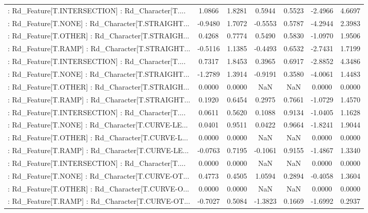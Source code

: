 \begin{longtable}{p{4cm}cccccc}
 : Rd\_Feature[T.INTERSECTION] : Rd\_Character[T.... &  1.0866 &    1.8281 &  0.5944 &       0.5523 & -2.4966 &  4.6697 \\
 : Rd\_Feature[T.NONE] : Rd\_Character[T.STRAIGHT... & -0.9480 &    1.7072 & -0.5553 &       0.5787 & -4.2944 &  2.3983 \\
 : Rd\_Feature[T.OTHER] : Rd\_Character[T.STRAIGH... &  0.4268 &    0.7774 &  0.5490 &       0.5830 & -1.0970 &  1.9506 \\
 : Rd\_Feature[T.RAMP] : Rd\_Character[T.STRAIGHT... & -0.5116 &    1.1385 & -0.4493 &       0.6532 & -2.7431 &  1.7199 \\
 : Rd\_Feature[T.INTERSECTION] : Rd\_Character[T.... &  0.7317 &    1.8453 &  0.3965 &       0.6917 & -2.8852 &  4.3486 \\
 : Rd\_Feature[T.NONE] : Rd\_Character[T.STRAIGHT... & -1.2789 &    1.3914 & -0.9191 &       0.3580 & -4.0061 &  1.4483 \\
 : Rd\_Feature[T.OTHER] : Rd\_Character[T.STRAIGH... &  0.0000 &    0.0000 &     NaN &          NaN &  0.0000 &  0.0000 \\
 : Rd\_Feature[T.RAMP] : Rd\_Character[T.STRAIGHT... &  0.1920 &    0.6454 &  0.2975 &       0.7661 & -1.0729 &  1.4570 \\
 : Rd\_Feature[T.INTERSECTION] : Rd\_Character[T.... &  0.0611 &    0.5620 &  0.1088 &       0.9134 & -1.0405 &  1.1628 \\
 : Rd\_Feature[T.NONE] : Rd\_Character[T.CURVE-LE... &  0.0401 &    0.9511 &  0.0422 &       0.9664 & -1.8241 &  1.9044 \\
 : Rd\_Feature[T.OTHER] : Rd\_Character[T.CURVE-L... &  0.0000 &    0.0000 &     NaN &          NaN &  0.0000 &  0.0000 \\
 : Rd\_Feature[T.RAMP] : Rd\_Character[T.CURVE-LE... & -0.0763 &    0.7195 & -0.1061 &       0.9155 & -1.4867 &  1.3340 \\
 : Rd\_Feature[T.INTERSECTION] : Rd\_Character[T.... &  0.0000 &    0.0000 &     NaN &          NaN &  0.0000 &  0.0000 \\
 : Rd\_Feature[T.NONE] : Rd\_Character[T.CURVE-OT... &  0.4773 &    0.4505 &  1.0594 &       0.2894 & -0.4058 &  1.3604 \\
 : Rd\_Feature[T.OTHER] : Rd\_Character[T.CURVE-O... &  0.0000 &    0.0000 &     NaN &          NaN &  0.0000 &  0.0000 \\
 : Rd\_Feature[T.RAMP] : Rd\_Character[T.CURVE-OT... & -0.7027 &    0.5084 & -1.3823 &       0.1669 & -1.6992 &  0.2937 \\

\end{longtable}
